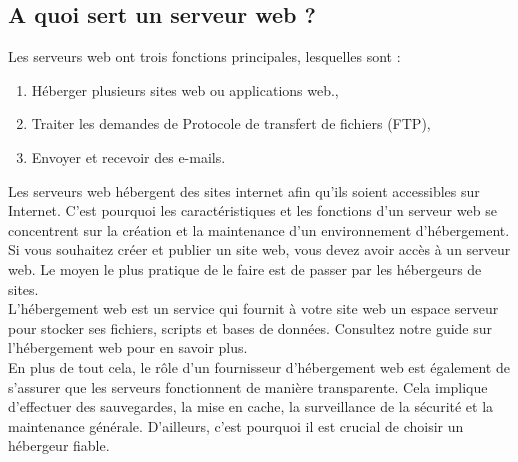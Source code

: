 \subsection{A quoi sert un serveur web ?}

Les serveurs web ont trois fonctions principales, lesquelles sont :
\begin{enumerate}
	\item  Héberger plusieurs sites web ou applications web.,
	 \item  Traiter les demandes de Protocole de transfert de fichiers (FTP),
	 \item  Envoyer et recevoir des e-mails.
\end{enumerate}
Les serveurs web hébergent des sites internet afin qu’ils soient accessibles sur Internet. C’est pourquoi les caractéristiques et les fonctions d’un serveur web se concentrent sur la création et la maintenance d’un environnement d’hébergement.\\

Si vous souhaitez créer et publier un site web, vous devez avoir accès à un serveur web. Le moyen le plus pratique de le faire est de passer par les hébergeurs de sites.\\

L’hébergement web est un service qui fournit à votre site web un espace serveur pour stocker ses fichiers, scripts et bases de données. Consultez notre guide sur l’hébergement web pour en savoir plus.\\

En plus de tout cela, le rôle d’un fournisseur d’hébergement web est également de s’assurer que les serveurs fonctionnent de manière transparente. Cela implique d’effectuer des sauvegardes, la mise en cache, la surveillance de la sécurité et la maintenance générale. D’ailleurs, c’est pourquoi il est crucial de choisir un hébergeur fiable.\\

